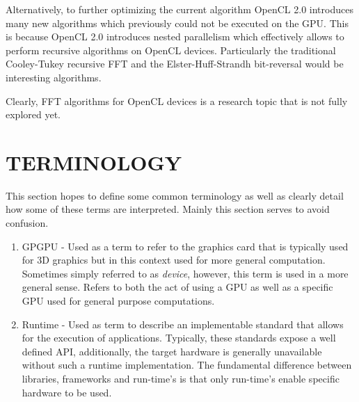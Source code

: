 \documentclass[conference]{IEEEtran}
\begin{document}
Alternatively, to further optimizing the current algorithm OpenCL 2.0
introduces many new algorithms which previously could not be executed on the
GPU. This is because OpenCL 2.0 introduces nested parallelism which effectively
allows to perform recursive algorithms on OpenCL devices. Particularly the
traditional Cooley-Tukey recursive FFT and the
Elster-Huff-Strandh\cite{Elster2009} bit-reversal would be interesting
algorithms.

Clearly, FFT algorithms for OpenCL devices is a research topic that is not
fully explored yet.

\section*{TERMINOLOGY} \label{term}

This section hopes to define some common terminology as well as clearly detail
how some of these terms are interpreted. Mainly this section serves to avoid
confusion.

\begin{enumerate}
	\item GPGPU - Used as a term to refer to the graphics card that is
	typically used for 3D graphics but in this context used for more general 
	computation. Sometimes simply referred to as \textit{device}, however, this
	term is used in a more general sense. Refers to both the act of using a GPU
	as well as a specific GPU used for general purpose computations.
	\item Runtime - Used as term to describe an implementable standard that
	allows for the execution of applications. Typically, these standards expose
	a well defined API, additionally, the target hardware is generally
	unavailable without such a runtime implementation. The fundamental
	difference between libraries, frameworks and run-time's is that only
	run-time's enable specific hardware to be used.
\end{enumerate}



\end{document}
